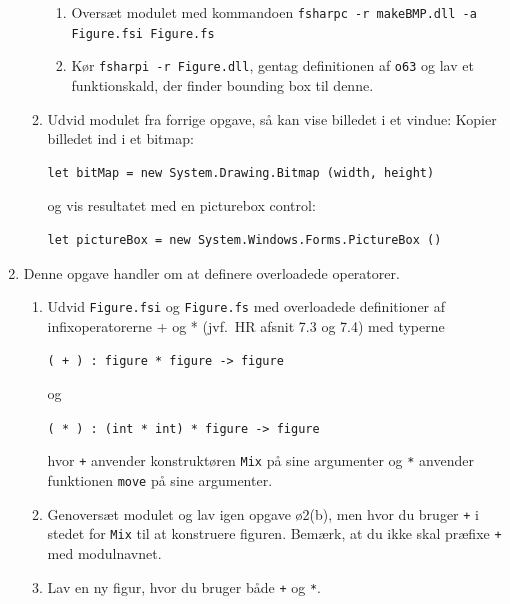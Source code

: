 \documentclass[a4paper,12pt]{article}
\begin{document}
\begin{enumerate}[label=4ø.\arabic*,start=0]
\begin{enumerate}
    \begin{enumerate}
    \item Oversæt modulet med kommandoen \texttt{fsharpc -r makeBMP.dll -a Figure.fsi Figure.fs}
      
    \item Kør \texttt{fsharpi -r Figure.dll}, gentag definitionen af \texttt{o63} og lav et funktionskald, der finder bounding box til denne.
    \end{enumerate}
    
  \item Udvid modulet fra forrige opgave, så kan vise billedet i et vindue: Kopier billedet ind i et bitmap:
\begin{verbatim}
let bitMap = new System.Drawing.Bitmap (width, height)
\end{verbatim}
    og vis resultatet med en picturebox control:
\begin{verbatim}
let pictureBox = new System.Windows.Forms.PictureBox ()
\end{verbatim}
    
  \end{enumerate}
\item Denne opgave handler om at definere overloadede operatorer.
  
  \begin{enumerate}
  \item Udvid \texttt{Figure.fsi} og \texttt{Figure.fs} med overloadede definitioner af infixoperatorerne + og * (jvf.\ HR afsnit 7.3 og 7.4) med typerne
    
    \texttt{( + ) : figure * figure -> figure}
    
    og
    
    \texttt{( * ) : (int * int) * figure -> figure}

    hvor \texttt{+} anvender konstruktøren \texttt{Mix} på sine argumenter
    og \texttt{*} anvender funktionen \texttt{move} på sine argumenter.
    
  \item Genoversæt modulet og lav igen opgave ø2(b), men hvor du bruger \texttt{+} i
    stedet for \texttt{Mix} til at konstruere figuren.  Bemærk, at du ikke
    skal præfixe \texttt{+} med modulnavnet.
    
  \item Lav en ny figur, hvor du bruger både \texttt{+} og \texttt{*}.
    
  \end{enumerate}
\end{enumerate}
\end{document}
